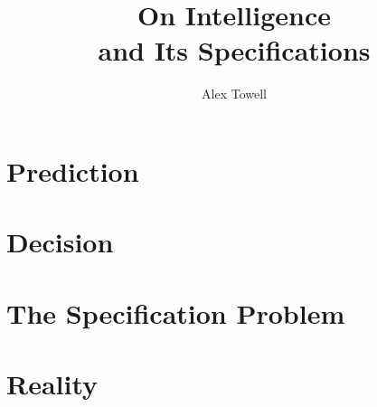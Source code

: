\documentclass[11pt,twoside]{book}
\title{On Intelligence\\[0.3em]\large and Its Specifications}
\author{Alex Towell}
\date{}
\begin{document}
\frontmatter
\maketitle



\tableofcontents



\mainmatter

\part{Prediction}






\part{Decision}






\part{The Specification Problem}






\part{Reality}







\backmatter

\ifdefined\HCode
\end{document}
